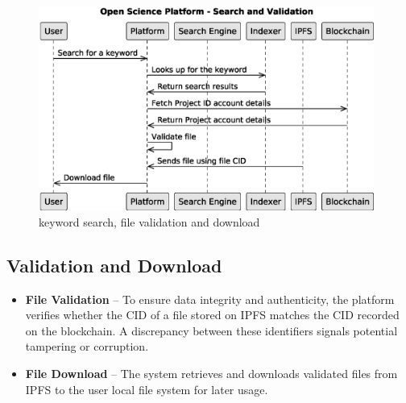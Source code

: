 \documentclass{article}
\begin{document}
\begin{figure}[htbp]
      \centering
      \includegraphics[width=0.98\textwidth, keepaspectratio]{c4_searching_and_validation.eps}
      \caption{keyword search, file validation and download}
      \label{fig:c4_keyword_search}
\end{figure}



\subsection{Validation and Download}

\begin{itemize}
      \item \textbf{File Validation} – To ensure data integrity and authenticity, the platform verifies whether the CID of a file stored on IPFS matches the CID recorded on the blockchain. A discrepancy between these identifiers signals potential tampering or corruption.

      \item \textbf{File Download} – The system retrieves and downloads validated files from IPFS to the user local file system for later usage.
\end{itemize}
\end{document}
